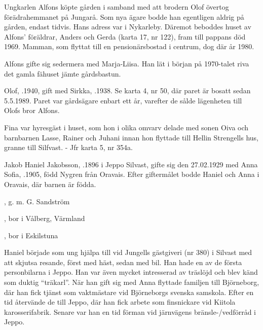 Ungkarlen Alfons köpte gården i samband med att brodern Olof övertog förädrahemmanet på Jungarå. Som nya ägare bodde han egentligen aldrig på gården, endast tidvis. Hans adress var i Nykarleby. Däremot beboddes huset av Alfons' föräldrar, Anders och Gerda (karta 17, nr 122), fram till pappans död 1969. Mamman, som flyttat till en pensionärsbostad i centrum, dog där år 1980.

Alfons gifte sig sedermera med Marja-Liisa. Han lät i början på 1970-talet riva det gamla fähuset jämte gårdsbastun.


Olof, .1940, gift med Sirkka, .1938. Se karta 4, nr 50, där paret är bosatt sedan 5.5.1989. Paret var gårdsägare enbart ett år, varefter de sålde lägenheten till Olofs bror Alfons.


Fina var hyresgäst i huset, som hon i olika omvarv delade med sonen Oiva och barnbarnen Lasse, Rainer och Juhani innan hon flyttade till Hellin Strengells hus, granne till Silfvast. - Jfr karta 5, nr 354a.


Jakob Haniel Jakobsson, .1896 i Jeppo Silvast, gifte sig den 27.02.1929 med Anna Sofia, .1905, född Nygren från Oravais. Efter giftermålet bodde Haniel och Anna i Oravais, där barnen är födda.
\begin{jhchildren}
  \item {}, g. m. G. Sandström
  \item {}
  \item {}, bor i Vålberg, Värmland
  \item {}, bor i Eskilstuna
\end{jhchildren}
Haniel började som ung hjälpa till vid Jungells gästgiveri (nr 380) i Silvast med att skjutsa resande, först med häst, sedan med bil. Han hade en av de första personbilarna i Jeppo. Han var även mycket intresserad av träslöjd och blev känd som duktig ``träkarl''. När han gift sig med Anna flyttade familjen till Björneborg, där han fick tjänst som vaktmästare vid Björneborgs svenska samskola. Efter en tid återvände de till Jeppo, där han fick arbete som finsnickare vid Kiitola karosserifabrik. Senare var han en tid förman vid järnvägens bränsle-/vedförråd i Jeppo.

